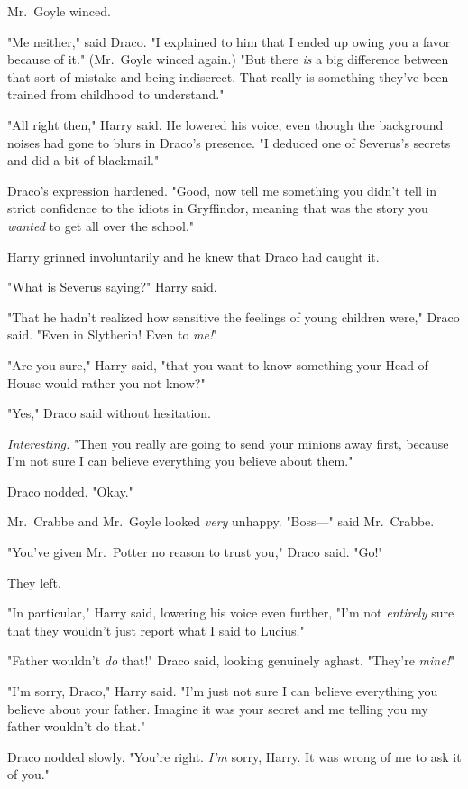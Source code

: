 Mr.~Goyle winced.

"Me neither," said Draco. "I explained to him that I ended up owing you a favor 
because of it." (Mr.~Goyle winced again.) "But there \emph{is} a big difference 
between that sort of mistake and being indiscreet. That really is something 
they've been trained from childhood to understand."

"All right then," Harry said. He lowered his voice, even though the background 
noises had gone to blurs in Draco's presence. "I deduced one of Severus's 
secrets and did a bit of blackmail."

Draco's expression hardened. "Good, now tell me something you didn't tell in 
strict confidence to the idiots in Gryffindor, meaning that was the story you 
\emph{wanted} to get all over the school."

Harry grinned involuntarily and he knew that Draco had caught it.

"What is Severus saying?" Harry said.

"That he hadn't realized how sensitive the feelings of young children were," 
Draco said. "Even in Slytherin! Even to \emph{me!}"

"Are you sure," Harry said, "that you want to know something your Head of House 
would rather you not know?"

"Yes," Draco said without hesitation.

\emph{Interesting.} "Then you really are going to send your minions away first, 
because I'm not sure I can believe everything you believe about them."

Draco nodded. "Okay."

Mr.~Crabbe and Mr.~Goyle looked \emph{very} unhappy. "Boss---" said Mr.~Crabbe.

"You've given Mr.~Potter no reason to trust you," Draco said. "Go!"

They left.

"In particular," Harry said, lowering his voice even further, "I'm not 
\emph{entirely} sure that they wouldn't just report what I said to Lucius."

"Father wouldn't \emph{do} that!" Draco said, looking genuinely aghast. 
"They're \emph{mine!}"

"I'm sorry, Draco," Harry said. "I'm just not sure I can believe everything you 
believe about your father. Imagine it was your secret and me telling you my 
father wouldn't do that."

Draco nodded slowly. "You're right. \emph{I'm} sorry, Harry. It was wrong of me 
to ask it of you."

